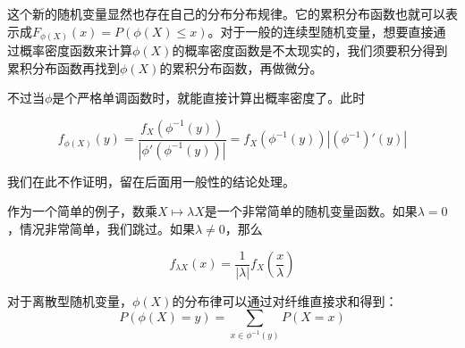 这个新的随机变量显然也存在自己的分布分布规律。它的累积分布函数也就可以表示成$F_{\phi(X)}(x)=P(\phi(X)\leq x)$。对于一般的连续型随机变量，想要直接通过概率密度函数来计算$\phi(X)$的概率密度函数是不太现实的，我们须要积分得到累积分布函数再找到$\phi(X)$的累积分布函数，再做微分。

不过当$\phi$是个严格单调函数时，就能直接计算出概率密度了。此时

\[
f_{\phi(X)}(y) = \frac{f_X(\phi^{-1}(y))}{|\phi'(\phi^{-1}(y))|} = f_X(\phi^{-1}(y))|(\phi^{-1})'(y)|
\]

我们在此不作证明，留在后面用一般性的结论处理。

作为一个简单的例子，数乘$X\mapsto\lambda X$是一个非常简单的随机变量函数。如果$\lambda=0$，情况非常简单，我们跳过。如果$\lambda \neq 0$，那么

\[
f_{\lambda X} (x) = \frac{1}{|\lambda|}f_X(\frac{x}{\lambda})
\]

对于离散型随机变量，$\phi(X)$的分布律可以通过对纤维直接求和得到：
\[
P(\phi(X)=y) = \sum_{x\in \phi^{-1}(y)}P(X=x)
\]
